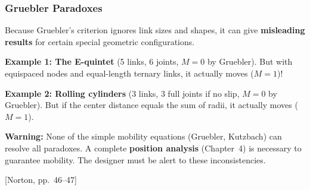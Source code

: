 \documentclass[10pt,aspectratio=43]{beamer}
\newcommand{\pref}[1]{\vfill\hfill{\scriptsize\color{gray}[Norton, pp.~#1]}}
\begin{document}

\begin{frame}
\frametitle{Gruebler Paradoxes}

Because Gruebler's criterion ignores link sizes and shapes, it can give \textbf{misleading results} for certain special geometric configurations.

\vspace{6pt}
\textbf{Example 1: The E-quintet} (5 links, 6 joints, $M = 0$ by Gruebler). But with equispaced nodes and equal-length ternary links, it actually moves ($M = 1$)!

\vspace{4pt}
\textbf{Example 2: Rolling cylinders} (3 links, 3 full joints if no slip, $M = 0$ by Gruebler). But if the center distance equals the sum of radii, it actually moves ($M = 1$).

\vspace{6pt}
\begin{redbox}
\textbf{Warning:} None of the simple mobility equations (Gruebler, Kutzbach) can resolve all paradoxes. A complete \textbf{position analysis} (Chapter~4) is necessary to guarantee mobility. The designer must be alert to these inconsistencies.
\end{redbox}
\pref{46--47}
\end{frame}

\end{document}
